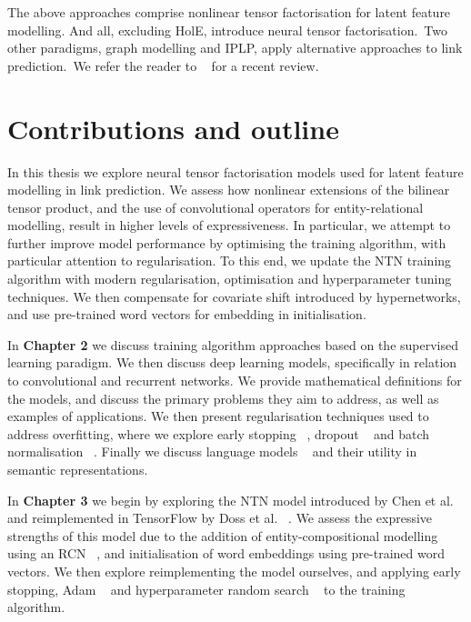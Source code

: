 \noindent The above approaches comprise nonlinear tensor factorisation for latent feature modelling. And all, excluding HolE, introduce neural tensor factorisation.\ Two other paradigms, graph modelling and IPLP, apply alternative approaches to link prediction.\ We refer the reader to \unskip~\citep{nickel2015review} for a recent review. \par



\section{Contributions and outline} %

\noindent In this thesis we explore neural tensor factorisation models used for latent feature modelling in link prediction. We assess how nonlinear extensions of the bilinear tensor product, and the use of convolutional operators for entity-relational modelling, result in higher levels of expressiveness. In particular, we attempt to further improve model performance by optimising the training algorithm, with particular attention to regularisation. To this end, we update the NTN training algorithm with modern regularisation, optimisation and hyperparameter tuning techniques. We then compensate for covariate shift introduced by hypernetworks, and use pre-trained word vectors for embedding in initialisation. \par

\noindent In \textbf{Chapter 2} we discuss training algorithm approaches based on the supervised learning paradigm. We then discuss deep learning models, specifically in relation to convolutional and recurrent networks. We provide mathematical definitions for the models, and discuss the primary problems they aim to address, as well as examples of applications. We then present regularisation techniques used to address overfitting, where we explore early stopping \unskip~\citep{prechelt1998early}, dropout \unskip ~\citep{srivastava2014dropout} and batch normalisation \unskip ~\citep{ioffe2015batch}. Finally we discuss language models \unskip~\citep{ bojanowski2016enriching, vaswani2017attention} and their utility in semantic representations. \par

\noindent In \textbf{Chapter 3} we begin by exploring the NTN model introduced by Chen et al. \unskip ~\citep{socher2013reasoning} and reimplemented in TensorFlow by Doss et al. \unskip ~\citep{Doss2015}. We assess the expressive strengths of this model due to the addition of entity-compositional modelling using an RCN \unskip ~\citep{socher2012semantic}, and initialisation of word embeddings using pre-trained word vectors. We then explore reimplementing the model ourselves, and applying early stopping, Adam \unskip ~\citep{kingma2014adam} and hyperparameter random search \unskip ~\citep{bergstra2012random} to the training algorithm. \par

